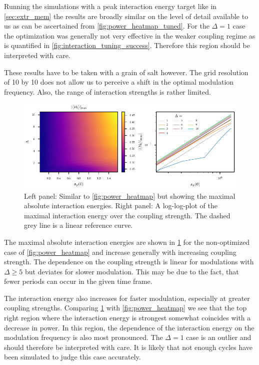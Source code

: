 Running the simulations with a peak interaction energy target like in
\cref{sec:extr_mem} the results are broadly similar on the level of
detail available to us as can be ascertained from
\cref{fig:power_heatmap_tuned}. For the \(Δ=1\) case the optimization
was generally not very effective in the weaker coupling regime as is
quantified in \cref{fig:interaction_tuning_success}. Therefore this
region should be interpreted with care.

These results have to be taken with a grain of salt however. The grid
resolution of 10 by 10 does not allow us to perceive a shift in the
optimal modulation frequency. Also, the range of interaction strengths
is rather limited.


\begin{figure}[htb]
  \centering
  \includegraphics{figs/one_bath_mod/interaction_nontuned}
  \caption{\label{fig:interaction_nontuned} Left panel: Similar to
    \cref{fig:power_heatmap} but showing the maximal absolute
    interaction energies. Right panel: A log-log-plot of the maximal
    interaction energy over the coupling strength. The dashed grey
    line is a linear reference curve.}
\end{figure}

The maximal absolute interaction energies are shown in
\cref{fig:interaction_nontuned} for the non-optimized case of
\cref{fig:power_heatmap} and increase generally with increasing
coupling strength. The dependence on the coupling strength is linear
for modulations with \(Δ\geq 5\) but deviates for slower
modulation. This may be due to the fact, that fewer periods can occur
in the given time frame.

The interaction energy also increases for faster modulation,
especially at greater coupling strengths. Comparing
\cref{fig:interaction_nontuned} with \cref{fig:power_heatmap} we see
that the top right region where the interaction energy is strongest
somewhat coincides with a decrease in power. In this region, the
dependence of the interaction energy on the modulation frequency is
also most pronounced.  The \(Δ=1\) case is an outlier and should
therefore be interpreted with care. It is likely that not enough
cycles have been simulated to judge this case accurately.


